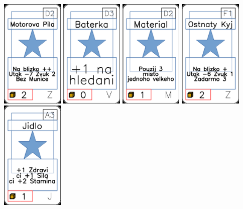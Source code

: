 \documentclass[a4paper]{article}
\begin{document}
	\includegraphics[width=3.0cm]{img-1_106}
	\includegraphics[width=3.0cm]{img-1_77}
	\includegraphics[width=3.0cm]{img-1_46}
	\includegraphics[width=3.0cm]{img-1_85}
	\includegraphics[width=3.0cm]{img-1_2}
\end{document}

